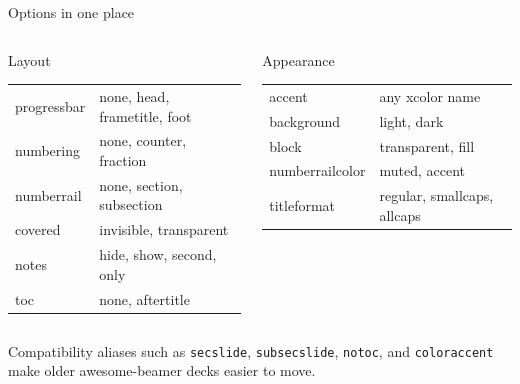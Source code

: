 \documentclass[aspectratio=169]{beamer}
\begin{document}
\begin{frame}{Options in one place}
  \begin{columns}[T,onlytextwidth]
      \begin{block}{Layout}
        \small
        \begin{tabularx}{\linewidth}{@{}>{\ttfamily}lX@{}}
          progressbar & none, head, frametitle, foot \\
          numbering & none, counter, fraction \\
          numberrail & none, section, subsection \\
          covered & invisible, transparent \\
          notes & hide, show, second, only \\
          toc & none, aftertitle
        \end{tabularx}
      \end{block}

      \begin{block}{Appearance}
        \small
        \begin{tabularx}{\linewidth}{@{}>{\ttfamily}lX@{}}
          accent & any xcolor name \\
          background & light, dark \\
          block & transparent, fill \\
          numberrailcolor & muted, accent \\
          titleformat & regular, smallcaps, allcaps
        \end{tabularx}
      \end{block}
  \end{columns}

  \vfill
  \small Compatibility aliases such as \texttt{secslide}, \texttt{subsecslide},
  \texttt{notoc}, and \texttt{coloraccent} make older awesome-beamer decks easier to move.
\end{frame}
\end{document}
